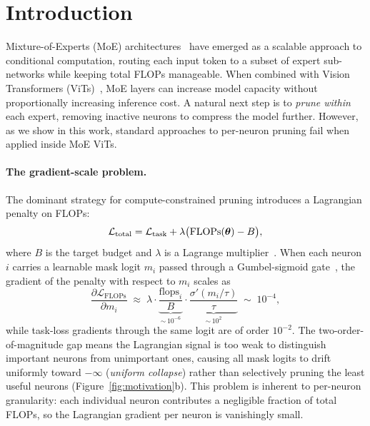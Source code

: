 \section{Introduction}
\label{sec:intro}

Mixture-of-Experts (MoE) architectures~\citep{shazeer2017outrageously,fedus2022switch} have emerged as a scalable approach to conditional computation, routing each input token to a subset of expert sub-networks while keeping total FLOPs manageable. When combined with Vision Transformers (ViTs)~\citep{dosovitskiy2021image,riquelme2021scaling}, MoE layers can increase model capacity without proportionally increasing inference cost. A natural next step is to \emph{prune within} each expert, removing inactive neurons to compress the model further. However, as we show in this work, standard approaches to per-neuron pruning fail when applied inside MoE ViTs.

\paragraph{The gradient-scale problem.}
The dominant strategy for compute-constrained pruning introduces a Lagrangian penalty on FLOPs:
\begin{equation}
\label{eq:lagrangian}
\mathcal{L}_{\text{total}} = \mathcal{L}_{\text{task}} + \lambda\bigl(\text{FLOPs}(\boldsymbol{\theta}) - B\bigr),
\end{equation}
where $B$ is the target budget and $\lambda$ is a Lagrange multiplier~\citep{gordon2018morphnet,lemaire2019structured}. When each neuron $i$ carries a learnable mask logit $m_i$ passed through a Gumbel-sigmoid gate~\citep{jang2017categorical,maddison2017concrete}, the gradient of the penalty with respect to $m_i$ scales as
\begin{equation}
\label{eq:grad_scale}
\frac{\partial \mathcal{L}_{\text{FLOPs}}}{\partial m_i} \;\approx\; \lambda \cdot \underbrace{\frac{\text{flops}_i}{B}}_{\sim\,10^{-6}} \cdot \underbrace{\frac{\sigma'(m_i/\tau)}{\tau}}_{\sim\,10^{2}} \;\sim\; 10^{-4},
\end{equation}
while task-loss gradients through the same logit are of order $10^{-2}$. The two-order-of-magnitude gap means the Lagrangian signal is too weak to distinguish important neurons from unimportant ones, causing all mask logits to drift uniformly toward $-\infty$ (\emph{uniform collapse}) rather than selectively pruning the least useful neurons (Figure~\ref{fig:motivation}b). This problem is inherent to per-neuron granularity: each individual neuron contributes a negligible fraction of total FLOPs, so the Lagrangian gradient per neuron is vanishingly small.

